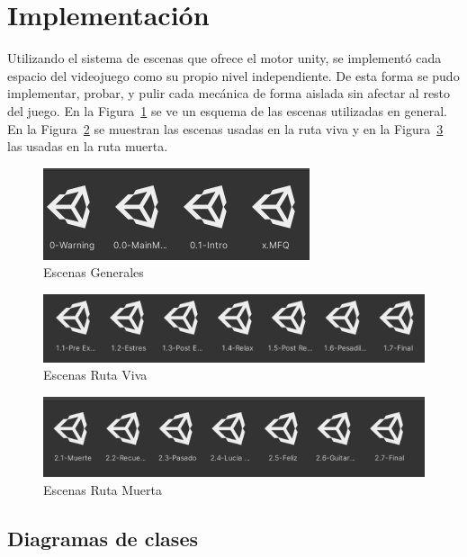 \section{Implementación}

Utilizando el sistema de escenas que ofrece el motor \Gls{unity}, se implementó cada espacio del videojuego como su propio nivel independiente. De esta forma se pudo implementar, probar, y pulir cada mecánica de forma aislada sin afectar al resto del juego. En la Figura~\ref{fig:escenas-general} se ve un esquema de las escenas utilizadas en general. En la Figura~\ref{fig:escenas-viva} se muestran las escenas usadas en la ruta viva y en la Figura~\ref{fig:escenas-muerta} las usadas en la ruta muerta.

\begin{figure}[h]
    \centering
    \includegraphics{imgs/unity1.png}
    \caption{Escenas Generales}
    \label{fig:escenas-general}
\end{figure}
\begin{figure}[h]
    \centering
    \includegraphics{imgs/unity2.png}
    \caption{Escenas Ruta Viva}
    \label{fig:escenas-viva}
\end{figure}
\begin{figure}[h]
    \centering
    \includegraphics{imgs/unity3.png}
    \caption{Escenas Ruta Muerta}
    \label{fig:escenas-muerta}
\end{figure}

\subsection{Diagramas de clases}

